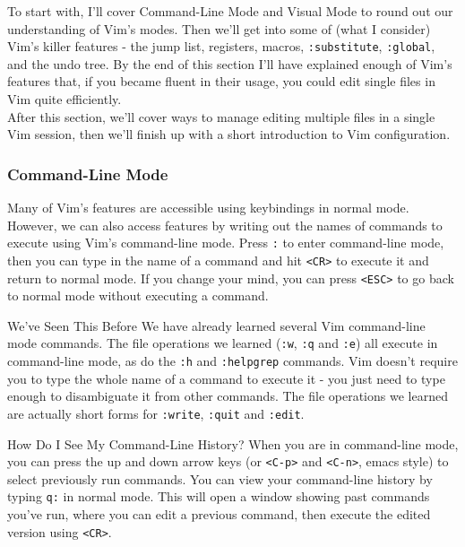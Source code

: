 \documentclass{beamer}
\begin{document}
\begin{frame}[fragile]
    \small
    To start with, I'll cover Command-Line Mode and Visual Mode to round out our understanding of Vim's modes. Then we'll get into some of (what I consider) Vim's killer features - the jump list, registers, macros, \verb+:substitute+, \verb+:global+, and the undo tree. By the end of this section I'll have explained enough of Vim's features that, if you became fluent in their usage, you could edit single files in Vim quite efficiently. \\
    \vspace{0.5cm}
    After this section, we'll cover ways to manage editing multiple files in a single Vim session, then we'll finish up with a short introduction to Vim configuration.
\end{frame}

\begin{frame}[fragile]
    \frametitle{Command-Line Mode}
    \small
    Many of Vim's features are accessible using keybindings in normal mode. However, we can also access features by writing out the names of commands to execute using Vim's command-line mode. Press \verb+:+ to enter command-line mode, then you can type in the name of a command and hit \verb+<CR>+ to execute it and return to normal mode. If you change your mind, you can press \verb+<ESC>+ to go back to normal mode without executing a command.\\
    \vspace{0.5cm}
    \begin{block}{We've Seen This Before}
	We have already learned several Vim command-line mode commands. The file operations we learned (\verb+:w+, \verb+:q+ and \verb+:e+) all execute in command-line mode, as do the \verb+:h+ and \verb+:helpgrep+ commands. Vim doesn't require you to type the whole name of a command to execute it - you just need to type enough to disambiguate it from other commands. The file operations we learned are actually short forms for \verb+:write+, \verb+:quit+ and \verb+:edit+.
    \end{block}
\end{frame}

\begin{frame}[fragile]
    \small
    \begin{block}{How Do I See My Command-Line History?}
	When you are in command-line mode, you can press the up and down arrow keys (or \verb+<C-p>+ and \verb+<C-n>+, emacs style) to select previously run commands. You can view your command-line history by typing \verb+q:+ in normal mode. This will open a window showing past commands you've run, where you can edit a previous command, then execute the edited version using \verb+<CR>+.
    \end{block}
\end{frame}
\end{document}
